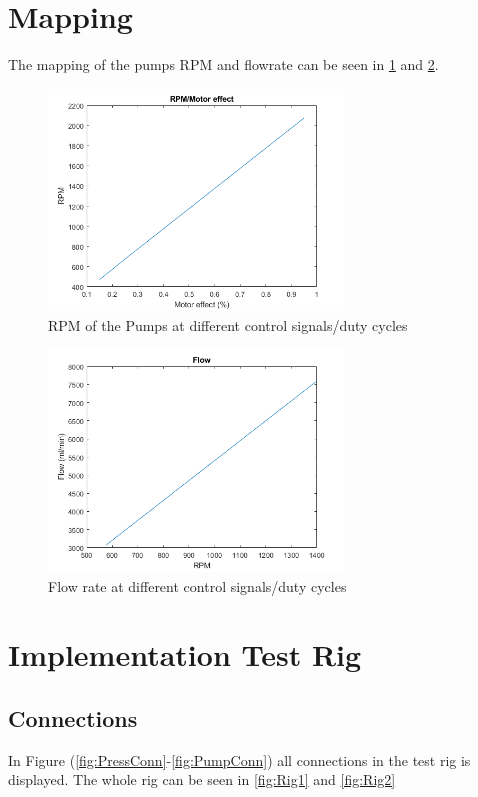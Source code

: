\newpage

\section{Mapping}
The mapping of the pumps RPM and flowrate can be seen in \ref{fig:RPM} and \ref{fig:Flowrate}.
\begin{figure}[h]
    \centering
    \includegraphics[width=0.7\textwidth]{RPM.png}
    \caption{RPM of the Pumps at different control signals/duty cycles}
    \label{fig:RPM}
\end{figure}


\begin{figure}[h]
    \centering
    \includegraphics[width=0.7\textwidth]{Flow.png}
    \caption{Flow rate at different control signals/duty cycles}
    \label{fig:Flowrate}
\end{figure}

\section{Implementation Test Rig}


\subsection{Connections}
In Figure (\ref{fig:PressConn}-\ref{fig:PumpConn}) all connections in the test rig is displayed. The whole rig can be seen in \ref{fig:Rig1} and \ref{fig:Rig2}


